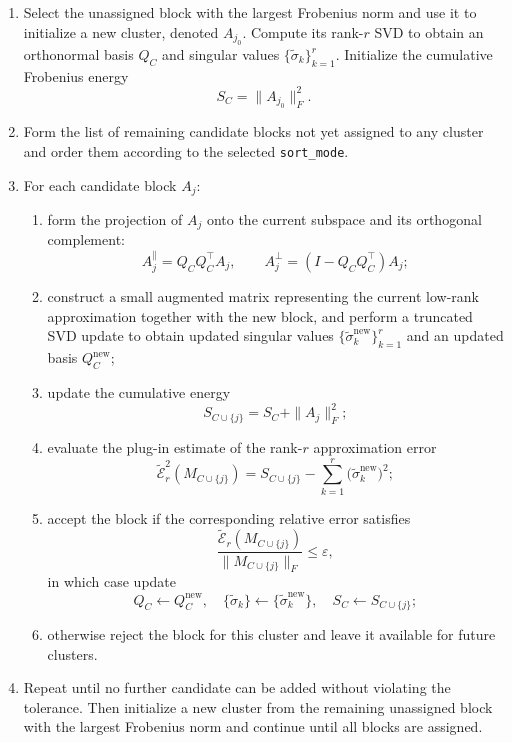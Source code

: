 \documentclass[10pt]{article} %
\begin{document}
\begin{enumerate}
  \item Select the unassigned block with the largest Frobenius norm and use it
  to initialize a new cluster, denoted $A_{j_0}$. Compute its rank-$r$ SVD to
  obtain an orthonormal basis $Q_C$ and singular values
  $\{\widetilde{\sigma}_k\}_{k=1}^r$. Initialize the cumulative Frobenius
  energy
  \[
    S_C = \|A_{j_0}\|_F^2.
  \]

  \item Form the list of remaining candidate blocks not yet assigned to any
  cluster and order them according to the selected \texttt{sort\_mode}.

  \item For each candidate block $A_j$:
  \begin{enumerate}
    \item form the projection of $A_j$ onto the current subspace and its
    orthogonal complement:
    \[
      A_j^{\parallel} = Q_C Q_C^\top A_j, \qquad
      A_j^{\perp} = (I - Q_C Q_C^\top) A_j;
    \]

    \item construct a small augmented matrix representing the current
    low-rank approximation together with the new block, and perform a
    truncated SVD update to obtain updated singular values
    $\{\widetilde{\sigma}_k^{\text{new}}\}_{k=1}^r$ and an updated basis
    $Q_C^{\text{new}}$;

    \item update the cumulative energy
    \[
      S_{C\cup\{j\}} = S_C + \|A_j\|_F^2;
    \]

    \item evaluate the plug-in estimate of the rank-$r$ approximation error
    \[
      \widetilde{\mathcal{E}}_r^2(M_{C\cup\{j\}})
      =
      S_{C\cup\{j\}} - \sum_{k=1}^r
      \bigl(\widetilde{\sigma}_k^{\text{new}}\bigr)^2;
    \]

    \item accept the block if the corresponding relative error satisfies
    \[
      \frac{\widetilde{\mathcal{E}}_r(M_{C\cup\{j\}})}
           {\|M_{C\cup\{j\}}\|_F}
      \le \varepsilon,
    \]
    in which case update
    \[
      Q_C \leftarrow Q_C^{\text{new}}, \quad
      \{\widetilde{\sigma}_k\} \leftarrow
      \{\widetilde{\sigma}_k^{\text{new}}\}, \quad
      S_C \leftarrow S_{C\cup\{j\}};
    \]

    \item otherwise reject the block for this cluster and leave it available
    for future clusters.
  \end{enumerate}

  \item Repeat until no further candidate can be added without violating the
  tolerance. Then initialize a new cluster from the remaining unassigned
  block with the largest Frobenius norm and continue until all blocks are
  assigned.
\end{enumerate}
\end{document}
